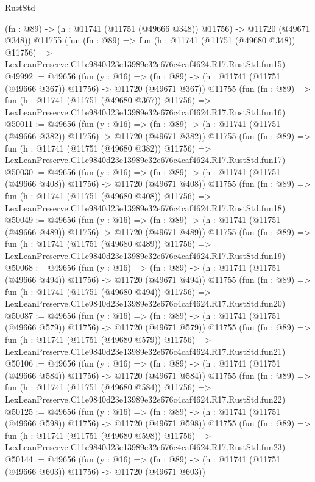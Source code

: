 \begin{lexlean}{RustStd}
\begin{coremodule}
    (fn : @89) -> (h : @11741 (@11751 (@49666 @348)) @11756) -> @11720 (@49671 @348))
    @11755
    (fun (fn : @89) =>
    fun (h : @11741 (@11751 (@49680 @348)) @11756) =>
    LexLeanPreserve.C11e9840d23e13989e32e676c4caf4624.R17.RustStd.fun15)
@49992 := @49656
    (fun (y : @16) =>
    (fn : @89) -> (h : @11741 (@11751 (@49666 @367)) @11756) -> @11720 (@49671 @367))
    @11755
    (fun (fn : @89) =>
    fun (h : @11741 (@11751 (@49680 @367)) @11756) =>
    LexLeanPreserve.C11e9840d23e13989e32e676c4caf4624.R17.RustStd.fun16)
@50011 := @49656
    (fun (y : @16) =>
    (fn : @89) -> (h : @11741 (@11751 (@49666 @382)) @11756) -> @11720 (@49671 @382))
    @11755
    (fun (fn : @89) =>
    fun (h : @11741 (@11751 (@49680 @382)) @11756) =>
    LexLeanPreserve.C11e9840d23e13989e32e676c4caf4624.R17.RustStd.fun17)
@50030 := @49656
    (fun (y : @16) =>
    (fn : @89) -> (h : @11741 (@11751 (@49666 @408)) @11756) -> @11720 (@49671 @408))
    @11755
    (fun (fn : @89) =>
    fun (h : @11741 (@11751 (@49680 @408)) @11756) =>
    LexLeanPreserve.C11e9840d23e13989e32e676c4caf4624.R17.RustStd.fun18)
@50049 := @49656
    (fun (y : @16) =>
    (fn : @89) -> (h : @11741 (@11751 (@49666 @489)) @11756) -> @11720 (@49671 @489))
    @11755
    (fun (fn : @89) =>
    fun (h : @11741 (@11751 (@49680 @489)) @11756) =>
    LexLeanPreserve.C11e9840d23e13989e32e676c4caf4624.R17.RustStd.fun19)
@50068 := @49656
    (fun (y : @16) =>
    (fn : @89) -> (h : @11741 (@11751 (@49666 @494)) @11756) -> @11720 (@49671 @494))
    @11755
    (fun (fn : @89) =>
    fun (h : @11741 (@11751 (@49680 @494)) @11756) =>
    LexLeanPreserve.C11e9840d23e13989e32e676c4caf4624.R17.RustStd.fun20)
@50087 := @49656
    (fun (y : @16) =>
    (fn : @89) -> (h : @11741 (@11751 (@49666 @579)) @11756) -> @11720 (@49671 @579))
    @11755
    (fun (fn : @89) =>
    fun (h : @11741 (@11751 (@49680 @579)) @11756) =>
    LexLeanPreserve.C11e9840d23e13989e32e676c4caf4624.R17.RustStd.fun21)
@50106 := @49656
    (fun (y : @16) =>
    (fn : @89) -> (h : @11741 (@11751 (@49666 @584)) @11756) -> @11720 (@49671 @584))
    @11755
    (fun (fn : @89) =>
    fun (h : @11741 (@11751 (@49680 @584)) @11756) =>
    LexLeanPreserve.C11e9840d23e13989e32e676c4caf4624.R17.RustStd.fun22)
@50125 := @49656
    (fun (y : @16) =>
    (fn : @89) -> (h : @11741 (@11751 (@49666 @598)) @11756) -> @11720 (@49671 @598))
    @11755
    (fun (fn : @89) =>
    fun (h : @11741 (@11751 (@49680 @598)) @11756) =>
    LexLeanPreserve.C11e9840d23e13989e32e676c4caf4624.R17.RustStd.fun23)
@50144 := @49656
    (fun (y : @16) =>
    (fn : @89) -> (h : @11741 (@11751 (@49666 @603)) @11756) -> @11720 (@49671 @603))

\end{coremodule}
\end{lexlean}
